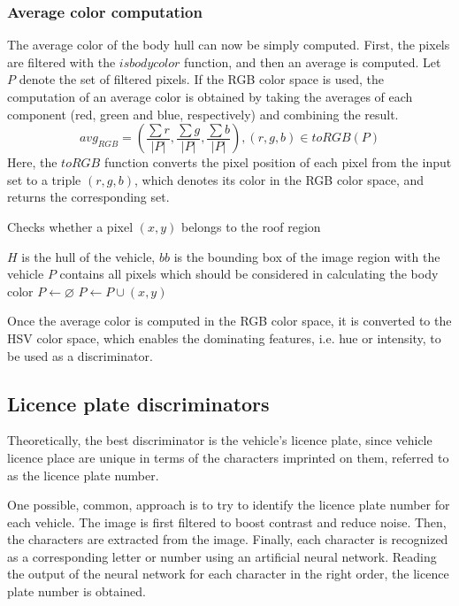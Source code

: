 \documentclass[times, utf8, zavrsni]{fer}
\begin{document}
\subsubsection{Average color computation}
The average color of the body hull can now be simply computed. First, the pixels
are filtered with the $isbodycolor$ function, and then an average is computed.
Let $P$ denote the set of filtered pixels. If the RGB
color space is used, the computation of an average color is obtained by taking
the averages of each component (red, green and blue, respectively) and combining
the result. \[ avg_{RGB} = (\frac{\sum{r}}{|P|}, \frac{\sum{g}}{|P|},
\frac{\sum{b}}{|P|}), (r, g, b) \in toRGB(P) \] 
Here, the $toRGB$ function converts the
pixel position of each pixel from the input set to a triple $(r, g, b)$, which
denotes its color in the RGB color space, and returns the corresponding set.

\begin{algorithm} 
\caption{Checks whether a pixel $(x, y)$ belongs to the roof region}
\label{algo:find-body-pixels}
\begin{algorithmic}
\REQUIRE $H$ is the hull of the vehicle, $bb$ is the bounding
box of the image region with the vehicle
\ENSURE $P$ contains all pixels which should be considered in calculating the
body color
\STATE $P \gets \varnothing$
\STATE $P \gets P \cup (x, y)$
\ENDIF
\ENDFOR
\end{algorithmic}
\end{algorithm}


Once the average color is computed in the RGB color space, it is converted to
the HSV color space, which enables the dominating features, i.e. hue or
intensity, to be used as a discriminator.


\subsection{Licence plate discriminators}

Theoretically, the best discriminator is the vehicle's licence plate, since
vehicle licence place are unique in terms of the characters imprinted on them,
referred to as the licence plate number.

One possible, common, approach is to try to identify the licence plate
number for each vehicle. The image is first
filtered to boost contrast and reduce noise. Then, the characters are extracted
from the image. Finally, each character is recognized as a corresponding letter
or number using an artificial neural network. Reading the output of the neural
network for each character in the right order, the licence plate number is
obtained.
\end{document}
